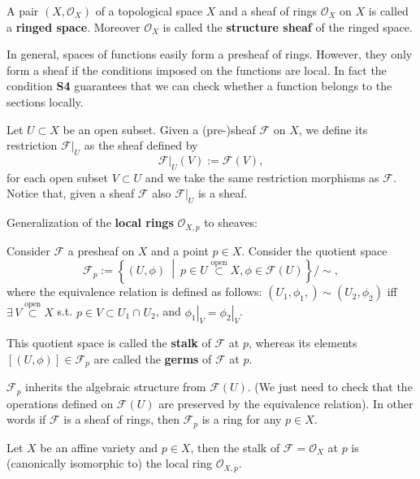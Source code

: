 \begin{defn}
	A pair $\left(X, \mathcal{O}_X\right)$ of a topological space $X$ and a sheaf of rings $\mathcal{O}_X$ on $X$ is called a \textbf{ringed space}.
	Moreover $\mathcal{O}_X$ is called the \textbf{structure sheaf} of the ringed space.
\end{defn}
\begin{rem}
	In general, spaces of functions easily form a presheaf of rings.
	However, they only form a sheaf if the conditions imposed on the functions are local.
	In fact the condition \textbf{S4} guarantees that we can check whether a function belongs to the sections locally.
\end{rem}

\begin{defn}
	Let $U \subset X$ be an open subset.
	Given a (pre-)sheaf $\mathcal{F}$ on $X$, we define its restriction $\left.\mathcal{F}\right|_{U}$ as the sheaf defined by
		\begin{equation}
			\left.\mathcal{F}\right|_{U} (V) := \mathcal{F}(V)
		,\end{equation} 
		for each open subset $V \subset U$ and we take the same restriction morphisms as $\mathcal{F}$.
		Notice that, given a sheaf $\mathcal{F}$ also $\left.\mathcal{F}\right|_{U}$ is a sheaf.
\end{defn}

Generalization of the \textbf{local rings} $\mathcal{O}_{X,p}$ to sheaves:
\begin{defn}
	Consider $\mathcal{F}$ a presheaf on $X$ and a point $p \in X$.
	Consider the quotient space
	\begin{equation}
		\mathcal{F}_p := \left\{ \left(U, \phi\right) \ \middle|\ p \in U \stackrel{\text{open}}{\subset} X, \phi \in \mathcal{F}(U)  \right\}/\sim
	,\end{equation} 
	where the equivalence relation is defined as follows:
	$\left(U_1, \phi_1, \right) \sim \left(U_2, \phi_2\right)$ iff $\exists\, V \stackrel{\text{open}}{\subset} X$ s.t.
	$p \in V \subset U_1 \cap_{} U_2$, and $\left.\phi_1\right|_{V} = \left.\phi_2\right|_{V}$.

	This quotient space is called the \textbf{stalk} of $\mathcal{F}$ at $p$, whereas its elements $\left[ \left(U, \phi\right) \right] \in \mathcal{F}_p$ are called  the \textbf{germs} of $\mathcal{F}$ at $p$.
\end{defn}

\begin{rem}
	$\mathcal{F}_p$ inherits the algebraic structure from $\mathcal{F}(U)$. (We just need to check that the operations defined on $\mathcal{F}(U)$ are preserved by the equivalence relation).
	In other words if $\mathcal{F}$ is a sheaf of rings, then $\mathcal{F}_p$ is a ring for any $p \in X$.
\end{rem}

\begin{lem}
	Let $X$ be an affine variety and $p \in X$, then the stalk of $\mathcal{F}= \mathcal{O}_X$ at $p$ is (canonically isomorphic to) the local ring $\mathcal{O}_{X,p}$.
\end{lem} 
